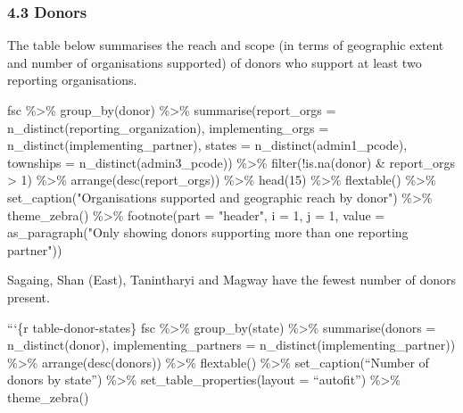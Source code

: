 \documentclass[
]{article}
\newenvironment{Shaded}{\begin{snugshade}}{\end{snugshade}}
\newcommand{\NormalTok}[1]{#1}
\begin{document}
\hypertarget{donors}{%
\subsubsection{4.3 Donors}\label{donors}}

The table below summarises the reach and scope (in terms of geographic
extent and number of organisations supported) of donors who support at
least two reporting organisations.

\begin{Shaded}
\begin{Highlighting}[]
\NormalTok{fsc \%\textgreater{}\% }
\NormalTok{  group\_by(donor) \%\textgreater{}\% }
\NormalTok{  summarise(report\_orgs = n\_distinct(reporting\_organization), }
\NormalTok{            implementing\_orgs = n\_distinct(implementing\_partner), }
\NormalTok{            states = n\_distinct(admin1\_pcode), }
\NormalTok{            townships = n\_distinct(admin3\_pcode)) \%\textgreater{}\% }
\NormalTok{  filter(!is.na(donor) \& report\_orgs \textgreater{} 1) \%\textgreater{}\% }
\NormalTok{  arrange(desc(report\_orgs)) \%\textgreater{}\%}
\NormalTok{  head(15) \%\textgreater{}\% }
\NormalTok{  flextable() \%\textgreater{}\% }
\NormalTok{  set\_caption("Organisations supported and geographic reach by donor") \%\textgreater{}\% }
\NormalTok{  theme\_zebra() \%\textgreater{}\% }
\NormalTok{  footnote(part = "header", }
\NormalTok{           i = 1, j = 1, }
\NormalTok{           value = as\_paragraph("Only showing donors supporting more than one reporting partner"))}
\end{Highlighting}
\end{Shaded}

Sagaing, Shan (East), Tanintharyi and Magway have the fewest number of
donors present.

```\{r table-donor-states\} fsc \%\textgreater\% group\_by(state)
\%\textgreater\% summarise(donors = n\_distinct(donor),
implementing\_partners = n\_distinct(implementing\_partner))
\%\textgreater\% arrange(desc(donors)) \%\textgreater\% flextable()
\%\textgreater\% set\_caption(``Number of donors by state'')
\%\textgreater\% set\_table\_properties(layout = ``autofit'')
\%\textgreater\% theme\_zebra()
\end{document}
